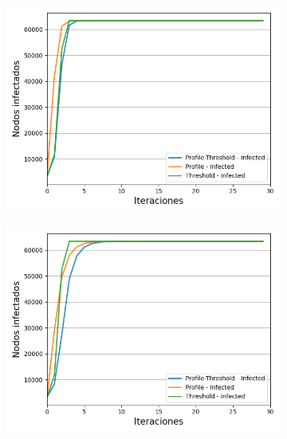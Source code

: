 \documentclass{article}
\begin{document}
\begin{figure}[!tbp]
	\begin{subfigure}[b]{0.5\textwidth}
		\includegraphics[width=\textwidth]{../Images/Fig 2 a).png}
		\caption{}
		\label{fig:f21}
	\end{subfigure}
	\hfill
	\begin{subfigure}[b]{0.5\textwidth}
		\includegraphics[width=\textwidth]{../Images/Fig 2 b).png}
		\caption{}
		\label{fig:f22}
	\end{subfigure}
	\begin{subfigure}[b]{0.5\textwidth}

\end{subfigure}
\end{figure}
\end{document}

